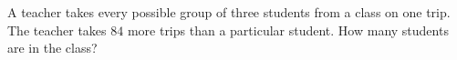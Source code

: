 A teacher takes every possible group of three students from a class on one trip. The teacher takes $ 84 $ more trips than a particular student. How many students are in the class?
